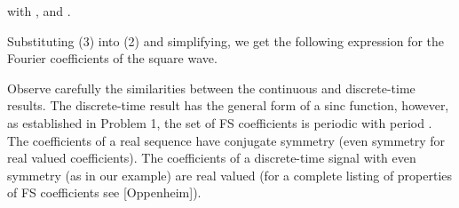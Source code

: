 \documentclass{article}
\begin{document}
\begin{CellGroup}

with , and . 



Substituting (3) into (2) and simplifying, we get the following expression for the Fourier coefficients of the square wave.

\begin{CellGroup}

\end{CellGroup}
Observe carefully the similarities between the continuous and discrete-time results. The discrete-time result has the general form of a sinc function,
however, as established in Problem 1, the set of FS coefficients is periodic with period . The coefficients of a real sequence
have conjugate symmetry (even symmetry for real valued coefficients). The coefficients of a discrete-time signal with even symmetry (as in our example)
are real valued (for a complete listing of properties of FS coefficients see [Oppenheim]).



\begin{CellGroup}
\begin{CellGroup}

\end{CellGroup}



\end{CellGroup}
\begin{CellGroup}




\end{CellGroup}
\end{CellGroup}
\end{document}
